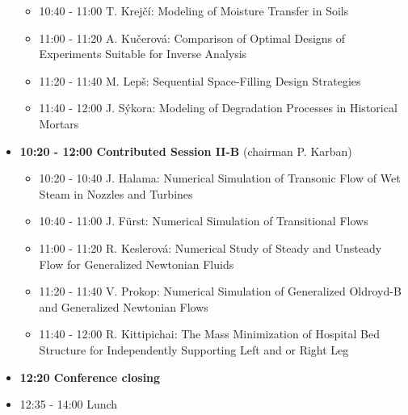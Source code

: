 \documentclass[10pt, A4]{article}%
\begin{document}
\begin{itemize}
\begin{itemize}
    \item 10:40 - 11:00 T. Krej\v{c}\'{i}: Modeling of Moisture Transfer in Soils
    \item 11:00 - 11:20 A. Ku\v{c}erov\'{a}: Comparison of Optimal Designs of Experiments Suitable for Inverse Analysis
    \item 11:20 - 11:40 M. Lep\v{s}: Sequential Space-Filling Design Strategies
    \item 11:40 - 12:00 J. S\'{y}kora: Modeling of Degradation Processes in Historical Mortars
  \end{itemize}
    \item {\bf 10:20 - 12:00 Contributed Session II-B} (chairman P. Karban) 
  \begin{itemize}
    \item 10:20 - 10:40 J. Halama: Numerical Simulation of Transonic Flow of Wet Steam in Nozzles and Turbines
    \item 10:40 - 11:00 J. F\"{u}rst: Numerical Simulation of Transitional Flows
    \item 11:00 - 11:20 R. Keslerov\'{a}: Numerical Study of Steady and Unsteady Flow for Generalized Newtonian Fluids
    \item 11:20 - 11:40 V. Prokop: Numerical Simulation of Generalized Oldroyd-B and Generalized Newtonian Flows
    \item 11:40 - 12:00 R. Kittipichai: The Mass Minimization of Hospital Bed Structure for Independently Supporting Left and or Right Leg
  \end{itemize}
  \item {\bf 12:20 Conference closing}
  \item 12:35 - 14:00 Lunch

\end{itemize}
\end{document}
